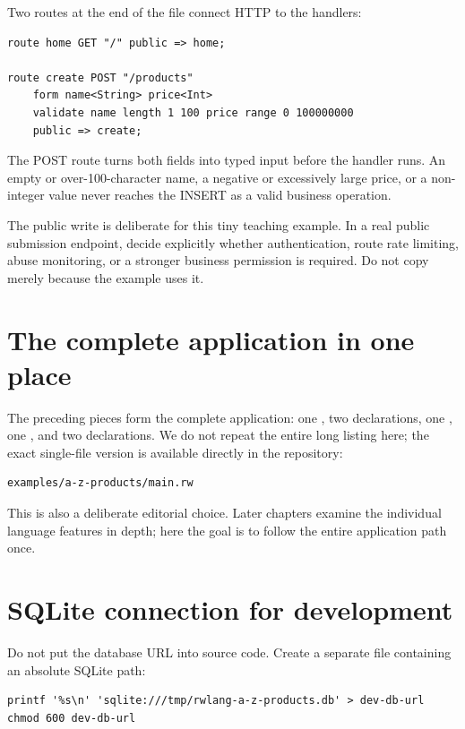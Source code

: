 Two routes at the end of the file connect HTTP to the handlers:

\begin{lstlisting}[language=RWLang]
route home GET "/" public => home;

route create POST "/products"
    form name<String> price<Int>
    validate name length 1 100 price range 0 100000000
    public => create;
\end{lstlisting}

The POST route turns both fields into typed input before the handler runs. An empty or over-100-character name, a negative or excessively large price, or a non-integer value never reaches the INSERT as a valid business operation.

The public write is deliberate for this tiny teaching example. In a real public submission endpoint, decide explicitly whether authentication, route rate limiting, abuse monitoring, or a stronger business permission is required. Do not copy  merely because the example uses it.

\section{The complete application in one place}

The preceding pieces form the complete application: one , two  declarations, one , one , and two  declarations. We do not repeat the entire long listing here; the exact single-file version is available directly in the repository:

\begin{lstlisting}
examples/a-z-products/main.rw
\end{lstlisting}

This is also a deliberate editorial choice. Later chapters examine the individual language features in depth; here the goal is to follow the entire application path once.

\section{SQLite connection for development}

Do not put the database URL into source code. Create a separate file containing an absolute SQLite path:

\begin{lstlisting}
printf '%s\n' 'sqlite:///tmp/rwlang-a-z-products.db' > dev-db-url
chmod 600 dev-db-url
\end{lstlisting}

